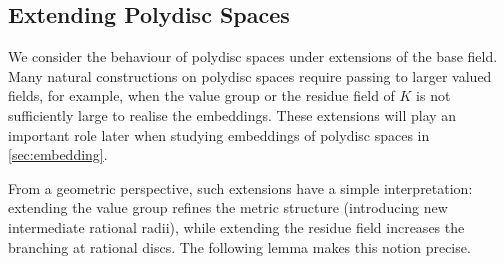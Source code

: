 \documentclass[10pt]{article}
\theoremstyle{definition}
\begin{document}

\subsection{Extending Polydisc Spaces}

We consider the behaviour of polydisc spaces under extensions of the base field. Many natural constructions on polydisc spaces require passing to larger valued fields, for example, when the value group or the residue field of $K$ is not sufficiently large to realise the embeddings. These extensions will play an important role later when studying embeddings of polydisc spaces in \cref{sec:embedding}.

From a geometric perspective, such extensions have a simple interpretation: extending the value group refines the metric structure (introducing new intermediate rational radii), while extending the residue field increases the branching at rational discs. The following lemma makes this notion precise.
\end{document}
